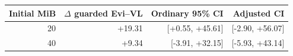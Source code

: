\begin{tabular}{rrrr}
\toprule
Initial MiB & $\Delta$ guarded Evi--VL & Ordinary 95\% CI & Adjusted CI\\\midrule
20 & +19.31 & [+0.55, +45.61] & [-2.90, +56.07]\\
40 & +9.34 & [-3.91, +32.15] & [-5.93, +43.14]\\
\bottomrule
\end{tabular}
